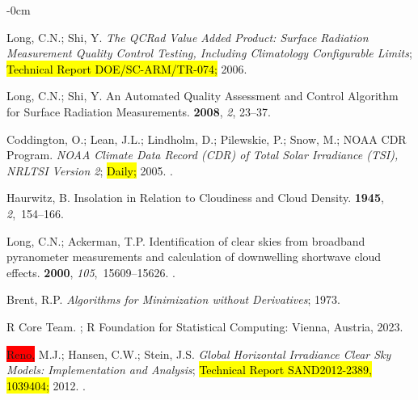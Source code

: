 \documentclass[applsci,article,accept,moreauthors,pdftex]{Definitions/mdpi}
\begin{document}
\begin{adjustwidth}{-\extralength}{0cm}
\begin{thebibliography}{999}
Long, C.N.; Shi, Y.
\newblock \emph{The QCRad Value Added Product: Surface Radiation Measurement Quality
  Control Testing, Including Climatology Configurable Limits};
\newblock \hl{Technical Report DOE/SC-ARM/TR-074;} %
  2006.

Long, C.N.; Shi, Y.
\newblock An Automated Quality Assessment and Control Algorithm for Surface
  Radiation Measurements.
 {\bf 2008}, \emph{2}, 23--37.

Coddington, O.; Lean, J.L.; Lindholm, D.; Pilewskie, P.; Snow, M.; {NOAA CDR
  Program}.
\newblock \emph{{NOAA} Climate Data Record ({CDR}) of Total Solar Irradiance ({TSI}),
  {NRLTSI} Version 2}; \hl{{D}aily;} %
  2005.
.

Haurwitz, B.
\newblock Insolation in {Relation} to {Cloudiness} and {Cloud} {Density}.
 {\bf 1945}, {\em 2},~154--166.

Long, C.N.; Ackerman, T.P.
\newblock Identification of clear skies from broadband pyranometer measurements
  and calculation of downwelling shortwave cloud effects.
 {\bf 2000}, {\em
  105},~15609--15626.
.

Brent, R.P.
\newblock \emph{Algorithms for Minimization without Derivatives};
 {1973}.

{R Core Team}.
;
\newblock R Foundation for Statistical Computing: Vienna, Austria,  2023.

\colorbox{red}{Reno,} 
 M.J.; Hansen, C.W.; Stein, J.S.
\newblock \emph{Global Horizontal Irradiance Clear Sky Models: Implementation and
  Analysis};
\newblock \hl{Technical Report SAND2012-2389, 1039404;} %
  2012.
.


\end{thebibliography}
\end{adjustwidth}
\end{document}
